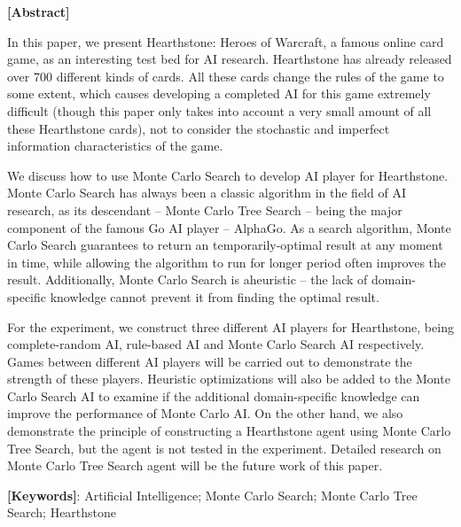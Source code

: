 \vspace{0.5cm}
{}
\centerline{\xiaoerhao \textbf{[Abstract]}}
\vspace{0.5cm}

In this paper, we present Hearthstone: Heroes of Warcraft, a famous online card game, as an interesting test bed for AI research. Hearthstone has already released over 700 different kinds of cards. All these cards change the rules of the game to some extent, which causes developing a completed AI for this game extremely difficult (though this paper only takes into account a very small amount of all these Hearthstone cards), not to consider the stochastic and imperfect information characteristics of the game.

We discuss how to use Monte Carlo Search to develop AI player for Hearthstone. Monte Carlo Search has always been a classic algorithm in the field of AI research, as its descendant -- Monte Carlo Tree Search -- being the major component of the famous Go AI player -- AlphaGo. As a search algorithm, Monte Carlo Search guarantees to return an temporarily-optimal result at any moment in time, while allowing the algorithm to run for longer period often improves the result. Additionally, Monte Carlo Search is aheuristic -- the lack of domain-specific knowledge cannot prevent it from finding the optimal result.

For the experiment, we construct three different AI players for Hearthstone, being complete-random AI, rule-based AI and Monte Carlo Search AI respectively. Games between different AI players will be carried out to demonstrate the strength of these players. Heuristic optimizations will also be added to the Monte Carlo Search AI to examine if the additional domain-specific knowledge can improve the performance of Monte Carlo AI.
On the other hand, we also demonstrate the principle of constructing a Hearthstone agent using Monte Carlo Tree Search, but the agent is not tested in the experiment.
Detailed research on Monte Carlo Tree Search agent will be the future work of this paper.

\par\setlength\parindent{0em}\textbf{[Keywords]}: Artificial Intelligence; Monte Carlo Search; Monte Carlo Tree Search; Hearthstone
\par\setlength\parindent{2em}
